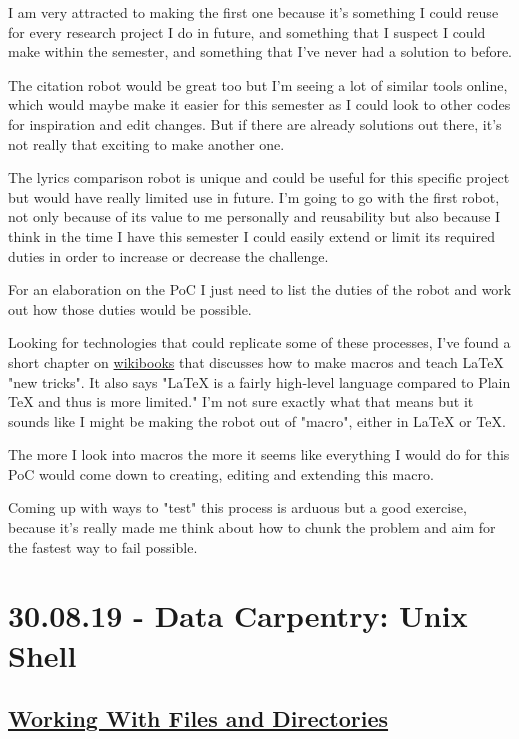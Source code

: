 \documentclass[12pt]{article}
\begin{document}
I am very attracted to making the first one because it's something I could reuse for every research project I do in future, and something that I suspect I could make within the semester, and something that I've never had a solution to before.

The citation robot would be great too but I'm seeing a lot of similar tools online, which would maybe make it easier for this semester as I could look to other codes for inspiration and edit changes. But if there are already solutions out there, it's not really that exciting to make another one.

The lyrics comparison robot is unique and could be useful for this specific project but would have really limited use in future. 
I'm going to go with the first robot, not only because of its value to me personally and reusability but also because I think in the time I have this semester I could easily extend or limit its required duties in order to increase or decrease the challenge.

For an elaboration on the PoC I just need to list the duties of the robot and work out how those duties would be possible.

Looking for technologies that could replicate some of these processes, I've found a short chapter on \href{https://en.wikibooks.org/wiki/LaTeX/Macros}{wikibooks} that discusses how to make macros and teach LaTeX "new tricks". It also says "LaTeX is a fairly high-level language compared to Plain TeX and thus is more limited." I'm not sure exactly what that means but it sounds like I might be making the robot out of "macro", either in LaTeX or TeX.

The more I look into macros the more it seems like everything I would do for this PoC would come down to creating, editing and extending this macro. 

Coming up with ways to "test" this process is arduous but a good exercise, because it's really made me think about how to chunk the problem and aim for the fastest way to fail possible. 

\newpage\section{30.08.19 - Data Carpentry: Unix Shell}
\subsection{\href{http://swcarpentry.github.io/shell-novice/03-create/index.html}{\textbf{Working With Files and Directories}}}
\end{document}
